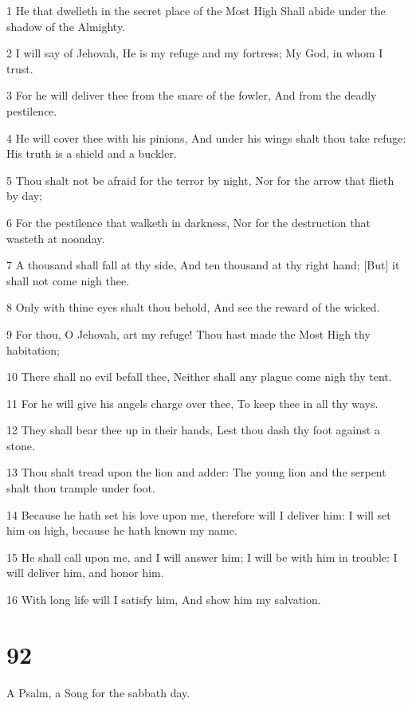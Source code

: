\par 1 He that dwelleth in the secret place of the Most High Shall abide under the shadow of the Almighty.
\par 2 I will say of Jehovah, He is my refuge and my fortress; My God, in whom I trust.
\par 3 For he will deliver thee from the snare of the fowler, And from the deadly pestilence.
\par 4 He will cover thee with his pinions, And under his wings shalt thou take refuge: His truth is a shield and a buckler.
\par 5 Thou shalt not be afraid for the terror by night, Nor for the arrow that flieth by day;
\par 6 For the pestilence that walketh in darkness, Nor for the destruction that wasteth at noonday.
\par 7 A thousand shall fall at thy side, And ten thousand at thy right hand; [But] it shall not come nigh thee.
\par 8 Only with thine eyes shalt thou behold, And see the reward of the wicked.
\par 9 For thou, O Jehovah, art my refuge! Thou hast made the Most High thy habitation;
\par 10 There shall no evil befall thee, Neither shall any plague come nigh thy tent.
\par 11 For he will give his angels charge over thee, To keep thee in all thy ways.
\par 12 They shall bear thee up in their hands, Lest thou dash thy foot against a stone.
\par 13 Thou shalt tread upon the lion and adder: The young lion and the serpent shalt thou trample under foot.
\par 14 Because he hath set his love upon me, therefore will I deliver him: I will set him on high, because he hath known my name.
\par 15 He shall call upon me, and I will answer him; I will be with him in trouble: I will deliver him, and honor him.
\par 16 With long life will I satisfy him, And show him my salvation.

\chapter{92}

\par A Psalm, a Song for the sabbath day.

